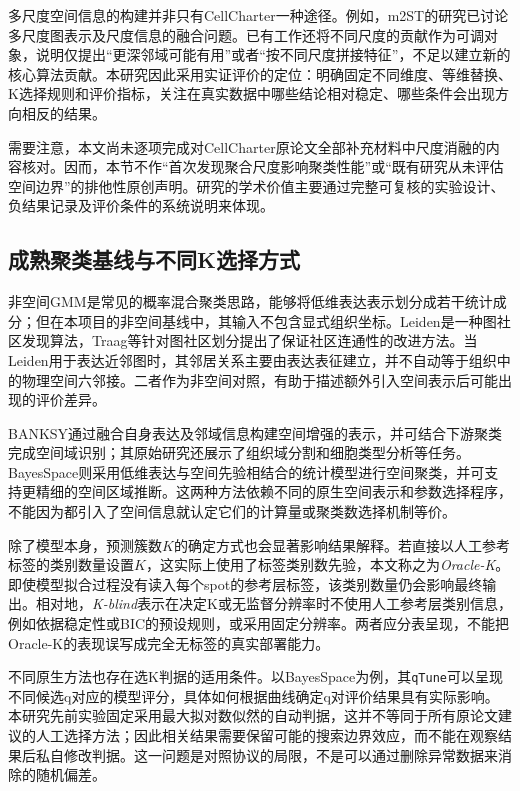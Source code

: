 多尺度空间信息的构建并非只有CellCharter一种途径。例如，m2ST的研究已讨论多尺度图表示及尺度信息的融合问题\cite{zhang2025}。已有工作还将不同尺度的贡献作为可调对象，说明仅提出“更深邻域可能有用”或者“按不同尺度拼接特征”，不足以建立新的核心算法贡献。本研究因此采用实证评价的定位：明确固定不同维度、等维替换、K选择规则和评价指标，关注在真实数据中哪些结论相对稳定、哪些条件会出现方向相反的结果。

需要注意，本文尚未逐项完成对CellCharter原论文全部补充材料中尺度消融的内容核对。因而，本节不作“首次发现聚合尺度影响聚类性能”或“既有研究从未评估空间边界”的排他性原创声明。研究的学术价值主要通过完整可复核的实验设计、负结果记录及评价条件的系统说明来体现。

\subsection{成熟聚类基线与不同K选择方式}
\label{subsec:cc-baselines-background-v1}

非空间GMM是常见的概率混合聚类思路，能够将低维表达表示划分成若干统计成分；但在本项目的非空间基线中，其输入不包含显式组织坐标。Leiden是一种图社区发现算法，Traag等针对图社区划分提出了保证社区连通性的改进方法\cite{traag2019}。当Leiden用于表达近邻图时，其邻居关系主要由表达表征建立，并不自动等于组织中的物理空间六邻接。二者作为非空间对照，有助于描述额外引入空间表示后可能出现的评价差异。

BANKSY通过融合自身表达及邻域信息构建空间增强的表示，并可结合下游聚类完成空间域识别；其原始研究还展示了组织域分割和细胞类型分析等任务\cite{singhal2024}。BayesSpace则采用低维表达与空间先验相结合的统计模型进行空间聚类，并可支持更精细的空间区域推断\cite{zhao2021}。这两种方法依赖不同的原生空间表示和参数选择程序，不能因为都引入了空间信息就认定它们的计算量或聚类数选择机制等价。

除了模型本身，预测簇数$K$的确定方式也会显著影响结果解释。若直接以人工参考标签的类别数量设置$K$，这实际上使用了标签类别数先验，本文称之为\textit{Oracle-K}。即使模型拟合过程没有读入每个spot的参考层标签，该类别数量仍会影响最终输出。相对地，\textit{K-blind}表示在决定K或无监督分辨率时不使用人工参考层类别信息，例如依据稳定性或BIC的预设规则，或采用固定分辨率。两者应分表呈现，不能把Oracle-K的表现误写成完全无标签的真实部署能力。

不同原生方法也存在选K判据的适用条件。以BayesSpace为例，其\texttt{qTune}可以呈现不同候选q对应的模型评分，具体如何根据曲线确定q对评价结果具有实际影响。本研究先前实验固定采用最大拟对数似然的自动判据，这并不等同于所有原论文建议的人工选择方法；因此相关结果需要保留可能的搜索边界效应，而不能在观察结果后私自修改判据。这一问题是对照协议的局限，不是可以通过删除异常数据来消除的随机偏差。


